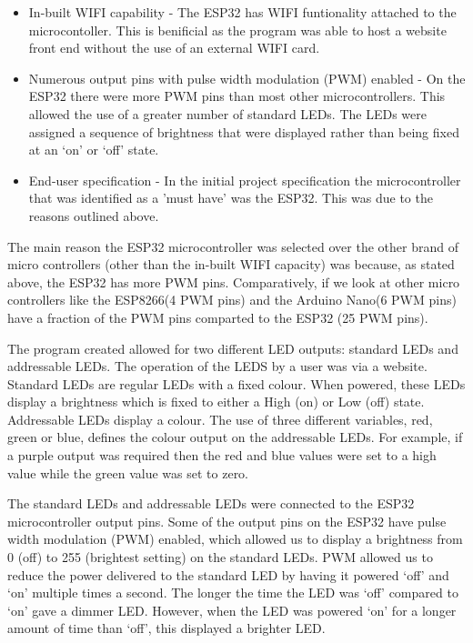 \begin{itemize}
\item In-built WIFI capability - The ESP32 has WIFI funtionality attached to the microcontoller. This is benificial as the program was able to host a website front end without the use of an external WIFI card. 

\item Numerous output pins with pulse width modulation (PWM) enabled - On the ESP32 there were more PWM pins than most other microcontrollers. This allowed the use of a greater number of standard LEDs. The LEDs were assigned a sequence of brightness that were displayed rather than being fixed at an ‘on’ or ‘off’ state. 

\item End-user specification - In the initial project specification the microcontroller that was identified as a 'must have' was the ESP32. This was due to the reasons outlined above. 
\end {itemize}

The main reason the ESP32 microcontroller was selected over the other brand of micro controllers (other than the in-built WIFI capacity) was because, as stated above, the ESP32 has more PWM pins. Comparatively, if we look at other micro controllers like the ESP8266(4 PWM pins) and the Arduino Nano(6 PWM pins) have a fraction of the PWM pins comparted to the ESP32 (25 PWM pins). 

The program created allowed for two different LED outputs: standard LEDs and addressable LEDs. The operation of the LEDS by a user was via a website. Standard LEDs are regular LEDs with a fixed colour. When powered, these LEDs display a brightness which is fixed to either a High (on) or Low (off) state. Addressable LEDs display a colour. The use of three different variables, red, green or blue, defines the colour output on the addressable LEDs. For example, if a purple output was required then the red and blue values were set to a high value while the green value was set to zero. 

The standard LEDs and addressable LEDs were connected to the ESP32 microcontroller output pins. Some of the output pins on the ESP32 have pulse width modulation (PWM) enabled, which allowed us to display a brightness from 0 (off) to 255 (brightest setting) on the standard LEDs. PWM allowed us to reduce the power delivered to the standard LED by having it powered ‘off’ and ‘on’ multiple times a second. The longer the time the LED was ‘off’ compared to ‘on’ gave a dimmer LED. However, when the LED was powered ‘on’ for a longer amount of time than ‘off’, this displayed a brighter LED.

